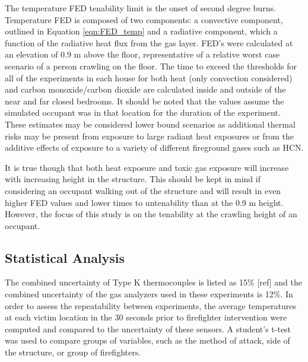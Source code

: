 \documentclass[12pt,oneside]{article}
\begin{document}
The temperature FED tenability limit is the onset of second degree burns. Temperature FED is composed of two components: a convective component, outlined in Equation \ref{eqn:FED_temp} and a radiative component, which a function of the radiative heat flux from the gas layer. FED's were calculated at an elevation of 0.9 m above the floor, representative of a relative worst case scenario of a person crawling on the floor. The time to exceed the thresholds for all of the experiments in each house for both heat (only convection considered) and carbon monoxide/carbon dioxide are calculated inside and outside of the near and far closed bedrooms.   It should be noted that the values assume the simulated occupant was in that location for the duration of the experiment. These estimates may be considered lower bound scenarios as additional thermal risks may be present from exposure to large radiant heat exposures or from the additive effects of exposure to a variety of different fireground gases such as HCN.  


It is true though that both heat exposure and toxic gas exposure will increase with increasing height in the structure. This should be kept in mind if considering an occupant walking out of the structure and will result in even higher FED values and lower times to untenability than at the 0.9 m height. However, the focus of this study is on the tenability at the crawling height of an occupant.


\subsection{Statistical Analysis}

The combined uncertainty of Type K thermocouples is listed as 15\% [ref] and the combined uncertainty of the gas analyzers used in these experiments is 12\%. In order to assess the repeatability between experiments, the average temperatures at each victim location in the 30 seconds prior to firefighter intervention were computed and compared to the uncertainty of these sensors. A student's t-test was used to compare groups of variables, such as the method of attack, side of the structure, or group of firefighters. 
\end{document}
